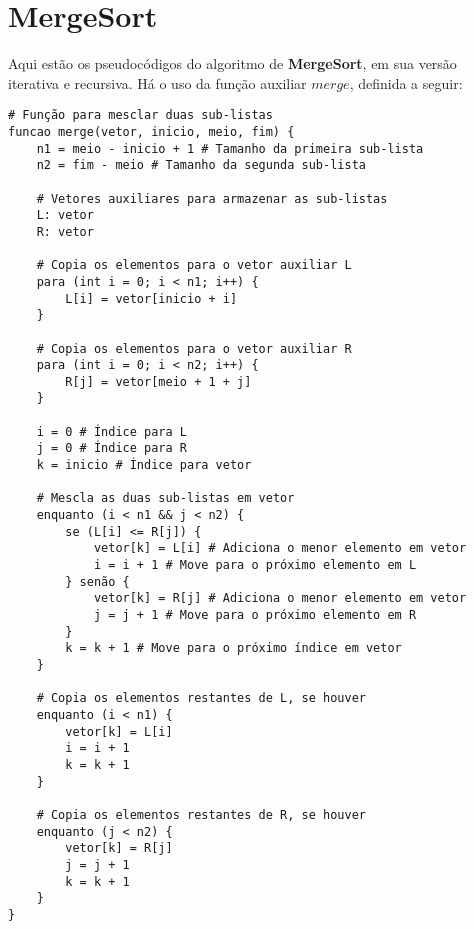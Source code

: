\section{MergeSort}
Aqui estão os pseudocódigos do algoritmo de \textbf{MergeSort}, em sua versão iterativa e recursiva. Há o uso da função auxiliar $merge$, definida a seguir:
\begin{verbatim}
# Função para mesclar duas sub-listas
funcao merge(vetor, inicio, meio, fim) {
    n1 = meio - inicio + 1 # Tamanho da primeira sub-lista
    n2 = fim - meio # Tamanho da segunda sub-lista

    # Vetores auxiliares para armazenar as sub-listas
    L: vetor
    R: vetor

    # Copia os elementos para o vetor auxiliar L
    para (int i = 0; i < n1; i++) {
        L[i] = vetor[inicio + i]
    }

    # Copia os elementos para o vetor auxiliar R
    para (int i = 0; i < n2; i++) {
        R[j] = vetor[meio + 1 + j]
    }

    i = 0 # Índice para L
    j = 0 # Índice para R
    k = inicio # Índice para vetor

    # Mescla as duas sub-listas em vetor
    enquanto (i < n1 && j < n2) {
        se (L[i] <= R[j]) {
            vetor[k] = L[i] # Adiciona o menor elemento em vetor
            i = i + 1 # Move para o próximo elemento em L
        } senão {
            vetor[k] = R[j] # Adiciona o menor elemento em vetor
            j = j + 1 # Move para o próximo elemento em R
        }
        k = k + 1 # Move para o próximo índice em vetor
    }

    # Copia os elementos restantes de L, se houver
    enquanto (i < n1) {
        vetor[k] = L[i]
        i = i + 1
        k = k + 1
    }

    # Copia os elementos restantes de R, se houver
    enquanto (j < n2) {
        vetor[k] = R[j]
        j = j + 1
        k = k + 1
    }
}
\end{verbatim}

 

 
 
